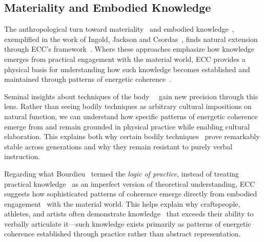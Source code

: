 \subsection*{Materiality and Embodied Knowledge}

The anthropological turn toward materiality~ and embodied knowledge~, exemplified in the work of Ingold, Jackson and Csordas~\cite{ingold2011being,jackson1989knowledge,csordas1990embodiment}, finds natural extension through ECC's framework~. Where these approaches emphasize how knowledge emerges from practical engagement with the material world, ECC provides a physical basis for understanding how such knowledge becomes established and maintained through patterns of energetic coherence~.

Seminal insights about techniques of the body~~\cite{mauss1973techniques,warnier2001praxeological} gain new precision through this lens. Rather than seeing bodily techniques as arbitrary cultural impositions on natural function, we can understand how specific patterns of energetic coherence~ emerge from and remain grounded in physical practice while enabling cultural elaboration. This explains both why certain bodily techniques~ prove remarkably stable across generations and why they remain resistant to purely verbal instruction.

Regarding what Bourdieu~\cite{bourdieu1990logic} termed the \textit{logic of practice}, instead of treating practical knowledge~ as an imperfect version of theoretical understanding, ECC suggests how sophisticated patterns of coherence emerge directly from embodied engagement~ with the material world. This helps explain why craftspeople, athletes, and artists often demonstrate knowledge~ that exceeds their ability to verbally articulate it—such knowledge exists primarily as patterns of energetic coherence established through practice rather than abstract representation.


